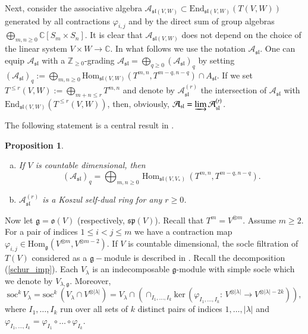 \documentclass{svmult}
\newtheorem{prop}[theo]{Proposition}
\newcommand {\ZZ} {\mathbb {Z}}
\newcommand {\CC} {\mathbb {C}}
\renewcommand{\sp}{\mathfrak{sp}}
\renewcommand{\sl}{\mathfrak{sl}}
\newcommand{\oo}{\mathfrak{o}}
\renewcommand{\gg}{\mathfrak{g}}
\renewcommand {\phi} {\varphi}
\newcommand{\Soc}{\mathrm{soc}}
\newcommand{\Ker}{\mathrm{ker}}
\newcommand{\Hom}{\mathrm{Hom}}
\newcommand{\End}{\mathrm{End}}
\begin{document}
Next, consider the associative algebra $\mathcal
A_{\sl(V,W)}\subset \End_{\sl(V,W)}(T(V,W))$ generated by all
contractions $\phi_{i,j}$ and 
by the direct sum of group algebras $\bigoplus_{m,n\geq  0}\CC[S_m\times S_n]$. It is clear that $\mathcal A_{\sl(V,W)}$ does
not depend on the choice of the linear system $V \times W \rightarrow\CC$. 
In what follows we use the notation $\mathcal A_{\sl}$. One can equip
$\mathcal A_{\sl}$ with a 
$\ZZ_{\geq 0}$-grading  $\mathcal A_{\sl}=\bigoplus_{q\geq 0}
(\mathcal A_{\sl})_q$ by setting 
$(\mathcal A_{\sl})_q:=\bigoplus_{m,n\geq
  0}{\mathrm{Hom}_{\sl(V,W)}}(T^{m,n},T^{m-q,n-q})\cap A_{\sl}$. If we
set 
$T^{\leq r}(V,W):=\bigoplus_{m+n\leq r} T^{m,n}$ and denote by
$\mathcal A_{\sl}^{(r)}$ the intersection of  
$\mathcal A_{\sl}$ with $\End_{\sl(V,W)}(T^{\leq r}(V,W))$, then,
obviously,   
$\mathcal A_{\sl}=\varinjlim \mathcal A_{\sl}^{(r)}$.

The following statement is a central result in \cite{DPS}.

\begin{prop}\label{Koszul1} 
\begin{enumerate}[a)]
 \item If $V$ is countable dimensional, then 
$$(\mathcal A_{\sl})_q = \bigoplus_{m,n \geq 0}\,\Hom_{\sl(V,V_*)}\,(T^{m,n},T^{m-q,n-q}).$$
 \item $\mathcal A_{\sl}^{(r)}$ is a Koszul self-dual ring for any $r \geq 0$.
\end{enumerate}
\end{prop}

Now let $\gg=\oo(V)$ (respectively, $\sp(V)$). Recall that $T^m =
V^{\otimes m}$. Assume $m\geq 2$. For a pair of indices 
$1\leq i<j\leq m$ we have a contraction map
$\varphi_{i,j}\in\Hom_\gg(V^{\otimes m},V^{\otimes m-2})$. 
If $V$ is countable dimensional, the socle filtration of $T(V)$
considered as a $\gg-$module is described in
\cite{pstyr}. Recall the decomposition (\ref{schur_imp}). Each
$V_\lambda$ is an indecomposable $\gg$-module with simple socle which 
we denote by $V_{\lambda,\gg}$. Moreover, 
$$\Soc^k\,V_{\lambda} = \Soc^k\,(V_{\lambda} \cap
V^{\otimes|\lambda|}) = V_{\lambda} \cap
(\cap_{I_1,\dots,I_k}\Ker\,(\phi_{I_1,\dots,I_k}:\,V^{\otimes|\lambda|}\rightarrow
V^{\otimes|\lambda|-2k})),$$ where $I_1,\dots,I_k$ run over all sets
of $k$ distinct pairs of indices $1,\dots,|\lambda|$ and $\phi_{I_1,\dots,I_k} = \phi_{I_1} \circ \dots \circ \phi_{I_k}$. 
\end{document}
